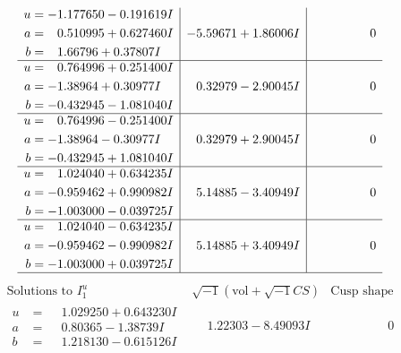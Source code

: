\documentclass[1p]{elsarticle_modified}
\theoremstyle{definition}
\newcommand{\I}{\sqrt{-1}}
\begin{document}
$$\begin{array}{c|c|c}
\begin{aligned}
u &= -1.177650 - 0.191619 I \\
a &= \phantom{-}0.510995 + 0.627460 I \\
b &= \phantom{-}1.66796 + 0.37807 I\end{aligned}
 & -5.59671 + 1.86006 I & \phantom{-0.000000 } 0 \\ \hline\begin{aligned}
u &= \phantom{-}0.764996 + 0.251400 I \\
a &= -1.38964 + 0.30977 I \\
b &= -0.432945 - 1.081040 I\end{aligned}
 & \phantom{-}0.32979 - 2.90045 I & \phantom{-0.000000 } 0 \\ \hline\begin{aligned}
u &= \phantom{-}0.764996 - 0.251400 I \\
a &= -1.38964 - 0.30977 I \\
b &= -0.432945 + 1.081040 I\end{aligned}
 & \phantom{-}0.32979 + 2.90045 I & \phantom{-0.000000 } 0 \\ \hline\begin{aligned}
u &= \phantom{-}1.024040 + 0.634235 I \\
a &= -0.959462 + 0.990982 I \\
b &= -1.003000 - 0.039725 I\end{aligned}
 & \phantom{-}5.14885 - 3.40949 I & \phantom{-0.000000 } 0 \\ \hline\begin{aligned}
u &= \phantom{-}1.024040 - 0.634235 I \\
a &= -0.959462 - 0.990982 I \\
b &= -1.003000 + 0.039725 I\end{aligned}
 & \phantom{-}5.14885 + 3.40949 I & \phantom{-0.000000 } 0\\
 \hline 
 \end{array}$$\newpage$$\begin{array}{c|c|c}  
\text{Solutions to }I^u_{1}& \I (\text{vol} + \sqrt{-1}CS) & \text{Cusp shape}\\
 \hline 
\begin{aligned}
u &= \phantom{-}1.029250 + 0.643230 I \\
a &= \phantom{-}0.80365 - 1.38739 I \\
b &= \phantom{-}1.218130 - 0.615126 I\end{aligned}
 & \phantom{-}1.22303 - 8.49093 I & \phantom{-0.000000 } 0 \\ \hline\begin{aligned}

\end{aligned}
\end{array}$$
\end{document}
